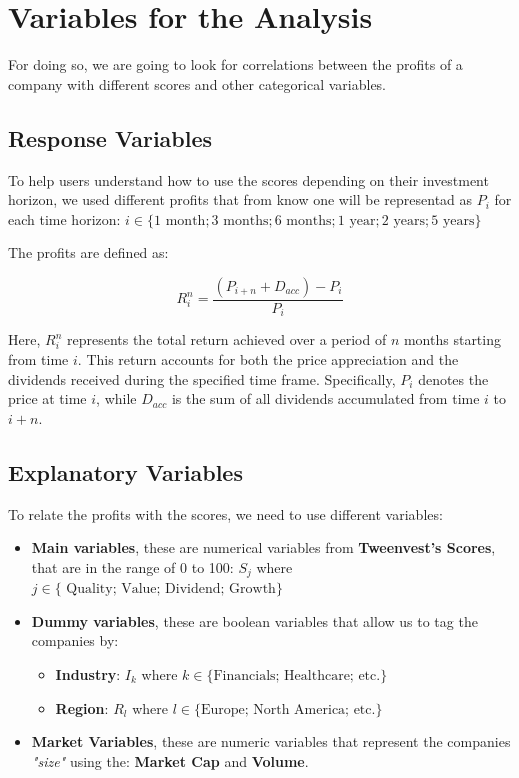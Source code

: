 \documentclass[11pt,english,a4paper,hidelinks]{book}
\begin{document}
\section{Variables for the Analysis}

For doing so, we are going to look for correlations between the profits of a company with different scores and other categorical variables.

\subsection{Response Variables}
To help users understand how to use the scores depending on their investment horizon, we used different profits that from know one will be representad as \(P_i\) for each time horizon: \(i \in \{1 \text{ month}; 3 \text{ months}; 6 \text{ months}; 1 \text{ year}; 2 \text{ years}; 5 \text{ years}\}\)

\vspace{0.5cm}
\noindent The profits are defined as:

\begin{equation}
    R_i^n = \frac{(P_{i+n} + D_{acc}) - P_{i}}{P_{i}}
\end{equation}

\noindent Here, \(R_i^n\) represents the total return achieved over a period of \(n\) months starting from time \(i\). This return accounts for both the price appreciation and the dividends received during the specified time frame. Specifically, \(P_i\) denotes the price at time \(i\), while \(D_{acc}\) is the sum of all dividends accumulated from time \(i\) to \(i+n\).


\subsection{Explanatory Variables}
To relate the profits with the scores, we need to use different variables:
\begin{itemize}
    \item \textbf{Main variables}, these are numerical variables from \textbf{Tweenvest's Scores}, that are in the range of 0 to 100: \(S_j\) where   \(j \in \{\text{ Quality; Value; Dividend; Growth}\}\)
    \item \textbf{Dummy variables}, these are boolean variables that allow us to tag the companies by:
    \begin{itemize}
        \item \textbf{Industry}: \(I_k\) where \(k \in \{\text{Financials; Healthcare; etc.}\}\)
        \item \textbf{Region}: \(R_l\) where \(l \in \{\text{Europe; North America; etc.}\}\)
    \end{itemize}
    \item \textbf{Market Variables}, these are numeric variables that represent the companies \textit{"size"} using the: \textbf{Market Cap} and \textbf{Volume}.
\end{itemize}
\end{document}
